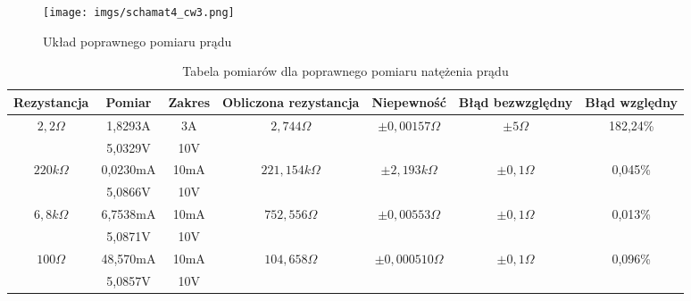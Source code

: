 \begin{figure}[!h]
    \centering
    \texttt{[image: imgs/schamat4\_cw3.png]}
    \caption{Układ poprawnego pomiaru prądu}
    \label{fig:enter-label}
\end{figure}

\begin{table}[!ht]
    \centering
    \begin{tabular}{|c||c|c|c|c|c|c|} \hline
        Rezystancja                   & Pomiar   & Zakres & Obliczona rezystancja             & Niepewność                            & Błąd bezwzględny & Błąd względny \\ \hline
        \multirow{2}{*}{$2,2\Omega$}  & 1,8293A  & 3A     & \multirow{2}{*}{$2,744\Omega$}    & \multirow{2}{*}{$\pm 0,00157\Omega$}  & \multirow{2}{*}{$\pm 5\Omega$} & \multirow{2}{*}{182,24\%}\\
                                      & 5,0329V  & 10V    &                                   &                                       & & \\ \hline
        \multirow{2}{*}{$220k\Omega$} & 0,0230mA & 10mA   & \multirow{2}{*}{$221,154k\Omega$} & \multirow{2}{*}{$\pm 2,193k\Omega$}   & \multirow{2}{*}{$\pm 0,1\Omega$} & \multirow{2}{*}{0,045\%}\\
                                      & 5,0866V  & 10V    &                                   &                                       &  & \\ \hline
        \multirow{2}{*}{$6,8k\Omega$} & 6,7538mA & 10mA   & \multirow{2}{*}{$752,556\Omega$}  & \multirow{2}{*}{$\pm 0,00553\Omega$}  & \multirow{2}{*}{$\pm 0,1\Omega$} & \multirow{2}{*}{0,013\%}\\
                                      & 5,0871V  & 10V    &                                   &                                       & & \\ \hline
        \multirow{2}{*}{$100\Omega$}  & 48,570mA & 10mA   & \multirow{2}{*}{$104,658\Omega$}  & \multirow{2}{*}{$\pm 0,000510\Omega$} & \multirow{2}{*}{$\pm 0,1\Omega$} & \multirow{2}{*}{0,096\%}\\
                                      & 5,0857V  & 10V    &                                   &                                       & & \\ \hline
    \end{tabular}
    \caption{Tabela pomiarów dla poprawnego pomiaru natężenia prądu}
    \label{tab:my_label}
\end{table}

